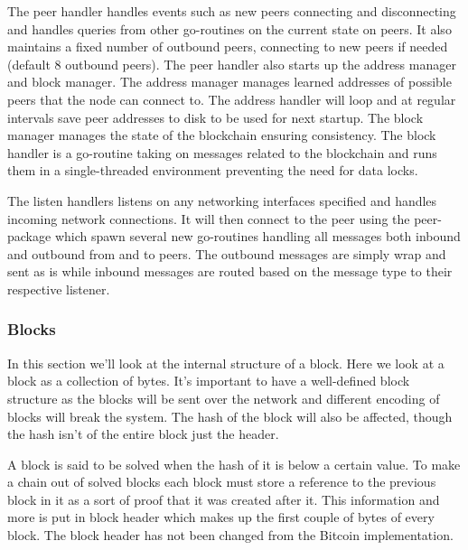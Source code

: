 \documentclass[12pt]{article}
\begin{document}
The peer handler handles events such as new peers connecting and disconnecting and handles queries from other go-routines on the current state on peers. It also maintains a fixed number of outbound peers, connecting to new peers if needed (default 8 outbound peers). The peer handler also starts up the address manager and block manager. The address manager manages learned addresses of possible peers that the node can connect to. The address handler will loop and at regular intervals save peer addresses to disk to be used for next startup. The block manager manages the state of the blockchain ensuring consistency. The block handler is a go-routine taking on messages related to the blockchain and runs them in a single-threaded environment preventing the need for data locks.

The listen handlers listens on any networking interfaces specified and handles incoming network connections. It will then connect to the peer using the peer-package which spawn several new go-routines handling all messages both inbound and outbound from and to peers. The outbound messages are simply wrap and sent as is while inbound messages are routed based on the message type to their respective listener.

\subsubsection{Blocks}
In this section we'll look at the internal structure of a block. Here we look at a block as a collection of bytes. It's important to have a well-defined block structure as the blocks will be sent over the network and different encoding of blocks will break the system. The hash of the block will also be affected, though the hash isn't of the entire block just the header.

A block is said to be solved when the hash of it is below a certain value. To make a chain out of solved blocks each block must store a reference to the previous block in it as a sort of proof that it was created after it. This information and more is put in block header which makes up the first couple of bytes of every block. The block header has not been changed from the Bitcoin implementation. 
\end{document}
